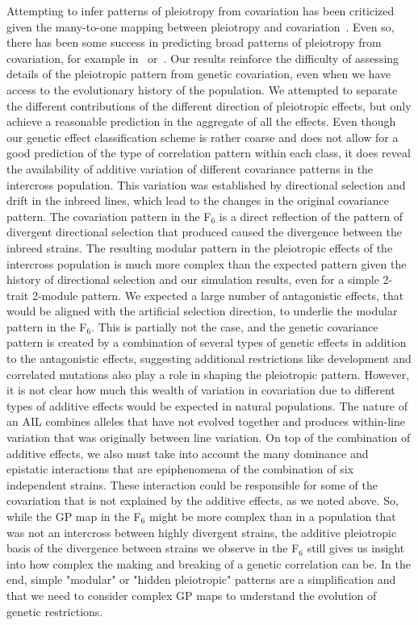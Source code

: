 \begin{refsection}
Attempting to infer patterns of pleiotropy from covariation has been
criticized given the many-to-one mapping between pleiotropy and
covariation~\parencite{Mitteroecker2007-xq, Mitteroecker2009-jb}. Even so,
there has been some success in predicting broad patterns of pleiotropy from
covariation, for example in~\textcite{Leamy2002-nh}
or~\textcite{Porto2016-qc}. Our results reinforce the difficulty of assessing
details of the pleiotropic pattern from genetic covariation, even when we have
access to the evolutionary history of the population. We attempted to separate
the different contributions of the different direction of pleiotropic effects,
but only achieve a reasonable prediction in the aggregate of all the effects.
Even though our genetic effect classification scheme is rather coarse and does
not allow for a good prediction of the type of correlation pattern within each
class, it does reveal the availability of additive variation of different
covariance patterns in the intercross population. This variation was
established by directional selection and drift in the inbreed lines, which
lead to the changes in the original covariance pattern. The covariation
pattern in the F$_{\text{6}}$ is a direct reflection of the pattern of
divergent directional selection that produced caused the divergence between
the inbreed strains. The resulting modular pattern in the pleiotropic effects
of the intercross population is much more complex than the expected pattern
given the history of directional selection and our simulation results, even
for a simple 2-trait 2-module pattern. We expected a large number of
antagonistic effects, that would be aligned with the artificial selection
direction, to underlie the modular pattern in the F$_{\text{6}}$. This is
partially not the case, and the genetic covariance pattern is created by a
combination of several types of genetic effects in addition to the
antagonistic effects, suggesting additional restrictions like development and
correlated mutations also play a role in shaping the pleiotropic pattern.
However, it is not clear how much this wealth of variation in covariation due
to different types of additive effects would be expected in natural
populations. The nature of an AIL combines alleles that have not evolved
together and produces within-line variation that was originally between line
variation. On top of the combination of additive effects, we also must take
into account the many dominance and epistatic interactions that are
epiphenomena of the combination of six independent strains. These interaction
could be responsible for some of the covariation that is not explained by the
additive effects, as we noted above. So, while the GP map in the
F$_{\text{6}}$ might be more complex than in a population that was not an
intercross between highly divergent strains, the additive pleiotropic basis of
the divergence between strains we observe in the F$_{\text{6}}$ still gives us
insight into how complex the making and breaking of a genetic correlation can
be. In the end, simple "modular" or "hidden pleiotropic" patterns are a
simplification and that we need to consider complex GP maps to understand the
evolution of genetic restrictions.

\printbibliography

\end{refsection}